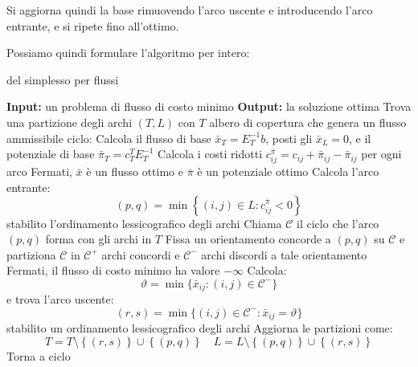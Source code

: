 \documentclass[a4paper,11pt]{article}
\begin{document}
Si aggiorna quindi la base rimuovendo l'arco uscente e introducendo l'arco entrante, e si ripete fino all'ottimo.

Possiamo quindi formulare l'algoritmo per intero:

\begin{algorithm}[H]
\caption{del simplesso per flussi}
\begin{algorithmic}
	\STATE \textbf{Input:} un problema di flusso di costo minimo 
	\STATE \textbf{Output:} la soluzione ottima 
	\STATE Trova una partizione degli archi $(T,L)$ con $T$ albero di copertura che genera un flusso ammissibile
	\STATE \textsf{ciclo:}
	\STATE Calcola il flusso di base $\bar{x}_T = E_T^{-1} b$, posti gli $\bar{x}_L = 0$, e il potenziale di base $\bar{\pi}_T = c_T^T E_T^{-1}$
	\STATE Calcola i costi ridotti $c_{ij}^{\bar{\pi}} = c_{ij} + \bar{\pi}_{ij} - \bar{\pi}_{ij}$ per ogni arco
	\STATE Fermati, $\bar{x}$ è un flusso ottimo e $\bar{\pi}$ è un potenziale ottimo
\ELSE
		\STATE Calcola l'arco entrante: 
		$$
		(p, q) = \min \left\{ (i, j) \in L : c_{ij}^{\bar{\pi}} < 0 \right\}
		$$
		stabilito l'ordinamento lessicografico degli archi
		\STATE Chiama $\mathcal{C}$ il ciclo che l'arco $(p, q)$ forma con gli archi in $T$
		\STATE Fissa un orientamento concorde a $(p,q)$ su $\mathcal{C}$ e partiziona $\mathcal{C}$ in $\mathcal{C^+}$ archi concordi e $\mathcal{C^-}$ archi discordi a tale orientamento
	\ENDIF
		\STATE Fermati, il flusso di costo minimo ha valore $-\infty$ 
	\ELSE
		\STATE Calcola:
		$$
		\vartheta = \min\{ \bar{x}_{ij} : (i, j) \in \mathcal{C}^- \}
		$$
		e trova l'arco uscente: 
		$$ 
		(r, s) = \min\{ (i, j) \in \mathcal{C}^- : \bar{x}_{ij} = \vartheta \} 
		$$
		stabilito un ordinamento lessicografico degli archi
	\ENDIF
	\STATE Aggiorna le partizioni come:
	$$
	T = T \setminus \left\{ (r,s) \right\} \cup \left\{ (p, q) \right\} \quad L = L \setminus \left\{ (p, q) \right\} \cup \left\{ (r, s) \right\}
	$$
	\STATE Torna a \textsf{ciclo}
\end{algorithmic}
\end{algorithm}
\end{document}
